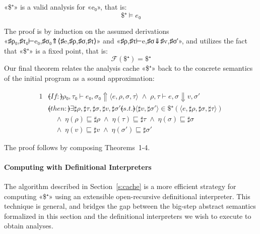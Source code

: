 \begin{theorem}
  «\$⁺» is a valid analysis for «e₀», that is:
  \[ \$⁺ ⊨ e₀ \]
\end{theorem}
The proof is by induction on the assumed derivations
«♯{ρ}₀,♯{τ}₀⊢e₀,♯{σ}₀⇑⟨♯{e},♯{ρ},♯{σ},♯{τ}⟩» and «♯{ρ},♯{τ}⊢e,♯{σ}⇓♯{v},♯{σ}′»,
and utilizes the fact that «\$⁺» is a fixed point, that is:
\[ ℱ(\$⁺) = \$⁺ \]
Our final theorem relates the analysis cache «\$⁺» back to the concrete
semantics of the initial program as a sound approximation:
\begin{theorem}
  \begin{alignat*}{1}
    & ⦑If:⦒ \mathrel{} ρ₀,τ₀⊢e₀,σ₀⇑⟨e,ρ,σ,τ⟩ \;∧\; ρ,τ⊢e,σ⇓v,σ′  \\
    & ⦑then:⦒ \mathrel{} ∃♯{ρ},♯{τ},♯{σ},♯{v},♯{σ}′ \mathrel{⦑s.t.⦒}  ⟨♯{v},♯{σ}′⟩ ∈ \$⁺(⟨e,♯{ρ},♯{σ},♯{τ}⟩)  \\
    & \hspace{1em} ∧\; η(ρ) ⊑ ♯{ρ} \;∧\; η(τ) ⊑ ♯{τ} \;∧\; η(σ) ⊑ ♯{σ} \\
    & \hspace{1em} ∧\; η(v) ⊑ ♯{v} \;∧\; η(σ′) ⊑ ♯{σ}′
  \end{alignat*}
\end{theorem}
The proof follows by composing Theorems~1-4.

\paragraph{Computing with Definitional Interpreters}

The algorithm described in Section~\ref{s:cache} is a more efficient strategy
for computing «\$⁺» using an extensible open-recursive definitional
interpreter. This technique is general, and bridges the gap between the
big-step abstract semantics formalized in this section and the definitional
interpreters we wish to execute to obtain analyses.

